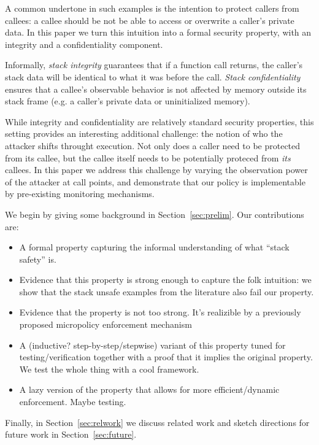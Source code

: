 \documentclass[acmsmall,review,anonymous]{acmart}\settopmatter{printfolios=true,printccs=false,printacmref=false}
\begin{document}
A common undertone in such examples is the intention to protect
callers from callees: a callee should be not be able to access or
overwrite a caller's private data. In this paper we turn this
intuition into a formal security property, with an integrity and
a confidentiality component.

Informally, {\em stack integrity} guarantees that if a function call
returns, the caller's stack data will be identical to what it was
before the call. {\em Stack confidentiality} ensures that a callee's
observable behavior is not affected by memory outside its stack frame
(e.g. a caller's private data or uninitialized memory).

While integrity and confidentiality are relatively standard security
properties, this setting provides an interesting additional challenge:
the notion of who the attacker shifts throught execution. Not only
does a caller need to be protected from its callee, but the callee
itself needs to be potentially proteced from {\em its} callees.  In
this paper we address this challenge by varying the observation power
of the attacker at call points, and demonstrate that our policy is
implementable by pre-existing monitoring mechanisms.

We begin by giving some background in Section~\ref{sec:prelim}.
Our contributions are:
\begin{itemize}
\item A formal property capturing the informal understanding of what ``stack safety'' is.
\item Evidence that this property is strong enough to capture the folk
intuition: we show that the stack
  unsafe examples from the literature also fail our property.
\item Evidence that the property is not too strong. It's realizible by
  a previously proposed  micropolicy enforcement mechanism 
\item A (inductive? step-by-step/stepwise) variant of this property
  tuned for testing/verification together with a proof that it implies
  the original property.  We test the whole thing with a cool
  framework.
\item A lazy version of the property that allows for more efficient/dynamic enforcement.
  Maybe testing.
\end{itemize}
Finally, in Section~\ref{sec:relwork} we discuss related work and
sketch directions for future work in Section~\ref{sec:future}.
\end{document}
